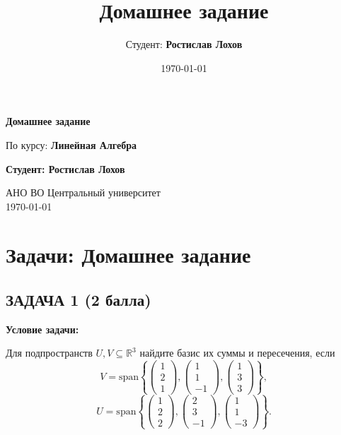 \documentclass[a4paper,12pt]{article}
\title{Домашнее задание}
\author{Студент: \textbf{Ростислав Лохов}}
\date{\today}
\begin{document}
\begin{titlepage}
    \centering
    \vspace*{1cm}

    \Huge
    \textbf{Домашнее задание}

    \vspace{0.5cm}
    \LARGE
    По курсу: \textbf{Линейная Алгебра}

    \vspace{1.5cm}

    \textbf{Студент: Ростислав Лохов}

    \vfill

    \Large
    АНО ВО Центральный университет\\
    \vspace{0.3cm}
    \today

\end{titlepage}

\tableofcontents
\newpage

\section{Задачи: Домашнее задание}

\subsection{ЗАДАЧА 1 \hfill \textbf{(2 балла)}}
\textbf{Условие задачи:}

Для подпространств \( U, V \subseteq \mathbb{R}^3 \) найдите базис их суммы и пересечения, если
\[
V = \text{span} \left\{
\begin{pmatrix}
1 \\
2 \\
1
\end{pmatrix},
\begin{pmatrix}
1 \\
1 \\
-1
\end{pmatrix},
\begin{pmatrix}
1 \\
3 \\
3
\end{pmatrix}
\right\},
\]
\[
U = \text{span} \left\{
\begin{pmatrix}
1 \\
2 \\
2
\end{pmatrix},
\begin{pmatrix}
2 \\
3 \\
-1
\end{pmatrix},
\begin{pmatrix}
1 \\
1 \\
-3
\end{pmatrix}
\right\}.
\]
\end{document}
